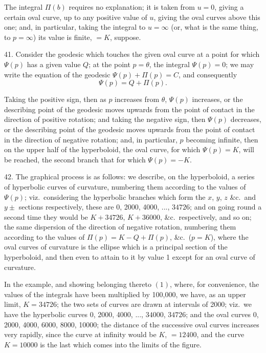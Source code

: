 \documentclass[11pt,a4paper]{article}
\begin{document}
The integral $\Pi(b)$ requires no explanation; it is taken from $u = 0$, giving a certain oval curve, up to any positive value of $u$, giving the oval curves above this one; and, in particular, taking the integral to $u = \infty$ (or, what is the same thing, to $p = \infty$) its value is finite, $= K$, suppose.

41. Consider the geodesic which touches the given oval curve at a point for which $\Psi(p)$ has a given value $Q$; at the point $p = \theta$, the integral $\Psi(p) = 0$; we may write the equation of the geodesic $\Psi(p) + \Pi(p) = C$, and consequently
\[
\Psi(p) = Q + \Pi(p).
\]

Taking the positive sign, then as $p$ increases from $\theta$, $\Psi(p)$ increases, or the describing point of the geodesic moves upwards from the point of contact in the direction of positive rotation; and taking the negative sign, then $\Psi(p)$ decreases, or the describing point of the geodesic moves upwards from the point of contact in the direction of negative rotation; and, in particular, $p$ becoming infinite, then on the upper half of the hyperboloid, the oval curve, for which $\Psi(p) = K$, will be reached, the second branch that for which $\Psi(p) = -K$.

42. The graphical process is as follows: we describe, on the hyperboloid, a series of hyperbolic curves of curvature, numbering them according to the values of $\Psi(p)$; viz.\ considering the hyperbolic branches which form the $x$, $y$, $z$ \&c.\ and $y \pm$ sections respectively, these are 0, 2000, 4000, ..., $34726$; and on going round a second time they would be $K + 34726$, $K + 36000$, \&c.\ respectively, and so on; the same dispersion of the direction of negative rotation, numbering them according to the values of $\Pi(p) = K - Q + \Pi(p)$, \&c.\ ($p = K$), where the oval curves of curvature is the ellipse which is a principal section of the hyperboloid, and then even to attain to it by value 1 except for an oval curve of curvature.

In the example, and showing belonging thereto $(1)$, where, for convenience, the values of the integrals have been multiplied by 100,000, we have, as an upper limit, $K = 34726$; the two sets of curves are drawn at intervals of 2000; viz.\ we have the hyperbolic curves 0, 2000, 4000, ..., $34000$, $34726$; and the oval curves 0, 2000, 4000, 6000, 8000, 10000; the distance of the successive oval curves increases very rapidly, since the curve at infinity would be $K$, $= 12400$, and the curve $K = 10000$ is the last which comes into the limits of the figure.
\end{document}
